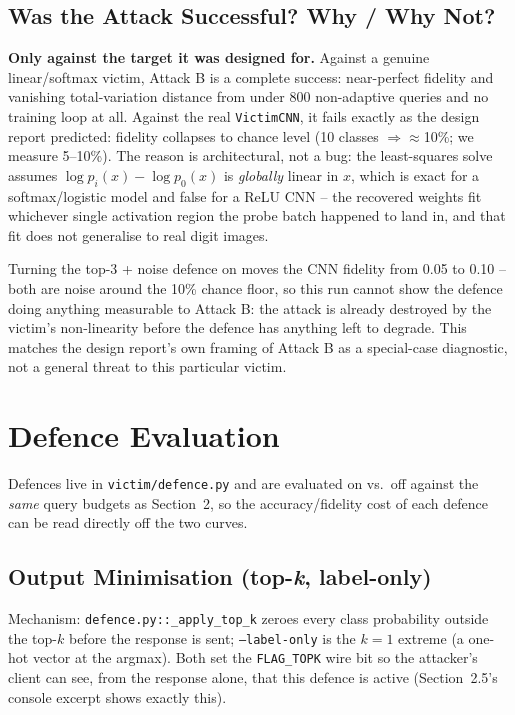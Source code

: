 \documentclass[11pt]{article}
\begin{document}
\subsection{Was the Attack Successful? Why / Why Not?}

\textbf{Only against the target it was designed for.} Against a genuine
linear/softmax victim, Attack B is a complete success: near-perfect fidelity
and vanishing total-variation distance from under 800 non-adaptive queries
and no training loop at all. Against the real \texttt{VictimCNN}, it fails
exactly as the design report predicted: fidelity collapses to chance level
(10 classes $\Rightarrow \approx$10\%; we measure 5--10\%). The reason is
architectural, not a bug: the least-squares solve assumes
$\log p_i(x) - \log p_0(x)$ is \emph{globally} linear in $x$, which is exact
for a softmax/logistic model and false for a ReLU CNN -- the recovered
weights fit whichever single activation region the probe batch happened to
land in, and that fit does not generalise to real digit images.

Turning the top-3 + noise defence on moves the CNN fidelity from 0.05 to
0.10 -- both are noise around the 10\% chance floor, so this run cannot show
the defence doing anything measurable to Attack B: the attack is already
destroyed by the victim's non-linearity before the defence has anything left
to degrade. This matches the design report's own framing of Attack B as a
special-case diagnostic, not a general threat to this particular victim.

\section{Defence Evaluation}

Defences live in \texttt{victim/defence.py} and are evaluated on vs.\ off
against the \emph{same} query budgets as Section~2, so the accuracy/fidelity
cost of each defence can be read directly off the two curves.

\subsection{Output Minimisation (top-\emph{k}, label-only)}

Mechanism: \texttt{defence.py::\_apply\_top\_k} zeroes every class probability
outside the top-$k$ before the response is sent; \texttt{--label-only} is the
$k{=}1$ extreme (a one-hot vector at the argmax). Both set the
\texttt{FLAG\_TOPK} wire bit so the attacker's client can see, from the
response alone, that this defence is active (Section~2.5's console excerpt
shows exactly this).
\end{document}
